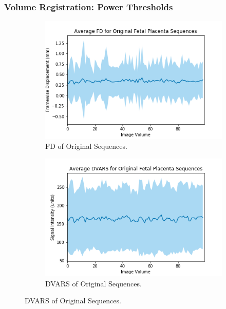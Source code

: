 \subsubsection{Volume Registration: Power Thresholds}

\begin{figure}[t]
	\centering
	\begin{subfigure}{0.4\textwidth}
		\centering
		\includegraphics[width=1.0\textwidth]{6/figures/fetal-placenta-bold-fd-150.png}
		\caption{FD of Original Sequences.}
	\end{subfigure}
	\hspace{0.05\textwidth}
	\begin{subfigure}{0.4\textwidth}
		\centering
		\includegraphics[width=1.0\textwidth]{6/figures/fetal-placenta-bold-dvars-150.png}
		\caption{DVARS of Original Sequences.}
	\end{subfigure}
	

\end{figure}
